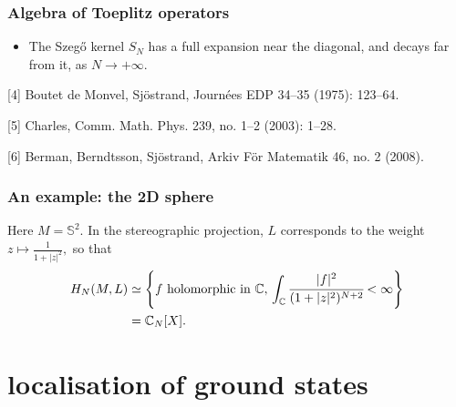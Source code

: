 \documentclass[mathserif]{beamer}
\begin{document}
\begin{frame}
  \frametitle{Algebra of Toeplitz operators}
  \begin{itemize}
  \item The Szeg\H{o} kernel $S_N$ has a full expansion near the
    diagonal, and decays far from it, as $N\to +\infty$.
  \end{itemize}
\vspace{1.5em}

\footnotesize{[4] Boutet de Monvel, Sjöstrand, Journées EDP 34–35 (1975): 123–64.

[5] Charles, Comm. Math. Phys. 239, no. 1–2 (2003): 1–28.

[6] Berman, Berndtsson, Sjöstrand,  Arkiv För Matematik
46, no. 2 (2008).
}
\end{frame}

\begin{frame}
  \frametitle{An example: the 2D sphere}
  Here $M=\mathbb{S}^2$. In the stereographic projection, $L$
  corresponds to the weight $z\mapsto \frac{1}{1+|z|^2},$ so
  that \begin{align*}H_N(M,L)&\simeq \left\{f\text{ holomorphic in
                               $\mathbb{C}$},\,\int_{\mathbb{C}}\cfrac{|f|^2}{(1+|z|^2)^{N+2}}<\infty\right\}\\
                             &=\mathbb{C}_N[X].\end{align*}
\end{frame}

\section{localisation of ground states}
\end{document}
